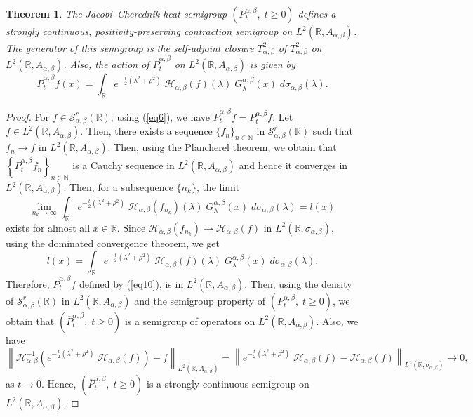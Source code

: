 \documentclass[a4paper,11pt, reqno]{amsart}
\theoremstyle{plain}
\newtheorem{theorem}{Theorem}[section]
\theoremstyle{definition}
\theoremstyle{remark}
\def \R{{\mathbb R}}
\def \N{{\mathbb N}}
\def\R{\mathbb R}
\def \S{{\mathcal S}}
\def \H{{\mathcal H}}
\begin{document}
\begin{theorem}\label{th3}
The Jacobi--Cherednik heat semigroup $\left(P^{\alpha, \beta}_t, \;t \geq 0\right)$ defines a strongly continuous, positivity-preserving contraction semigroup on $L^2(\R, A_{\alpha, \beta})$. The generator of this semigroup is the self-adjoint closure $\overline{T^2_{\alpha, \beta}}$ of $T^2_{\alpha, \beta}$ on $L^2(\R, A_{\alpha, \beta})$. Also, the action of $\overline{P}^{\alpha, \beta}_t$ on $L^2(\R, A_{\alpha, \beta})$ is given by
\begin{equation}\label{eq10}
\overline{P}^{\alpha, \beta}_t f(x) = \int_{\mathbb{R}} e^{-\frac{t}{2}\left( \lambda^2+\rho^2\right)} \; \H_{\alpha, \beta} (f) (\lambda)\;  G^{\alpha, \beta}_\lambda(x)\; d\sigma_{\alpha, \beta}(\lambda).
\end{equation}
\end{theorem}
\begin{proof}
For $f \in \S^r_{\alpha, \beta} (\mathbb{R})$, using (\ref{eq6}), we have $\overline{P}^{\alpha, \beta}_t f = P^{\alpha, \beta}_t f$. Let $f \in L^2(\R, A_{\alpha, \beta})$. Then, there exists a sequence $\{ f_n \}_{n \in \N}$ in $\S^r_{\alpha, \beta} (\mathbb{R})$ such that $f_n \rightarrow f$ in $L^2(\R, A_{\alpha, \beta})$. Then, using the Plancherel theorem, we obtain that $\left\{ \overline{P}^{\alpha, \beta}_t f_n \right\}_{n \in \N}$ is a Cauchy sequence in $L^2(\R, A_{\alpha, \beta})$ and hence it converges in $L^2(\R, A_{\alpha, \beta})$. Then, for a subsequence $\{n_k\}$, the limit
\[ \lim _{n_k \rightarrow \infty} \int_{\mathbb{R}} e^{-\frac{t}{2}\left( \lambda^2+\rho^2\right)} \; \H_{\alpha, \beta} (f_{n_k}) (\lambda)\;  G^{\alpha, \beta}_\lambda(x)\; d\sigma_{\alpha, \beta}(\lambda) = l(x) \]
exists for almost all $x \in \mathbb{R}$. Since $\H_{\alpha, \beta} (f_{n_k}) \rightarrow \H_{\alpha, \beta} (f)$ in $L^2(\R, \sigma_{\alpha, \beta})$, using the dominated convergence theorem, we get 
\[ l(x) = \int_{\mathbb{R}} e^{-\frac{t}{2}\left( \lambda^2+\rho^2\right)} \; \H_{\alpha, \beta} (f) (\lambda)\;  G^{\alpha, \beta}_\lambda(x)\; d\sigma_{\alpha, \beta}(\lambda). \] 
Therefore, $\overline{P}^{\alpha, \beta}_t f$ defined by (\ref{eq10}), is in $L^2(\R, A_{\alpha, \beta})$. Then, using the density of $\S^r_{\alpha, \beta} (\mathbb{R})$ in $ L^2(\R, A_{\alpha, \beta})$ and the semigroup property of $\left(P^{\alpha, \beta}_t, \;t \geq 0\right)$, we obtain that   $\left(\overline{P}^{\alpha, \beta}_t, \;t \geq 0\right)$ is a semigroup of operators on $L^2(\R, A_{\alpha, \beta})$. Also, we have 
\[ \left\| \H^{-1}_{\alpha, \beta} \left( e^{-\frac{t}{2}\left( \lambda^2+\rho^2\right)} \; \H_{\alpha, \beta} (f)\right) - f  \right\|_{L^2(\R, A_{\alpha, \beta})} = \left\| e^{-\frac{t}{2}\left( \lambda^2+\rho^2\right)} \; \H_{\alpha, \beta} (f) - \H_{\alpha, \beta} (f)  \right\|_{L^2(\R, \sigma_{\alpha, \beta})} \rightarrow 0, \]
as $t \rightarrow 0$. Hence, $\left(\overline{P}^{\alpha, \beta}_t, \;t \geq 0\right)$ is a strongly continuous semigroup on $L^2(\R, A_{\alpha, \beta})$.
\end{proof}
\end{document}
